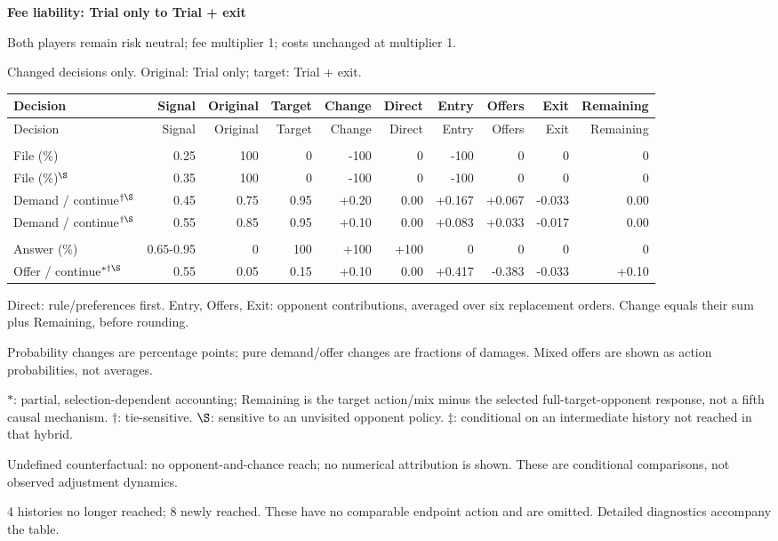 \documentclass[10pt]{article}
\begin{document}
{\large\bfseries Fee liability: Trial only to Trial + exit}\par
Both players remain risk neutral; fee multiplier 1; costs unchanged at multiplier 1.\par
{\small Changed decisions only. Original: Trial only; target: Trial + exit.}\par
{\small\setlength{\tabcolsep}{3pt}\begin{longtable}{@{}>{\raggedright\arraybackslash}p{1.65in}rrrrrrrrr@{}}
\toprule Decision & Signal & Original & Target & Change & Direct & Entry & Offers & Exit & Remaining \\\midrule\endfirsthead
\toprule Decision & Signal & Original & Target & Change & Direct & Entry & Offers & Exit & Remaining \\\midrule\endhead
\bottomrule\endfoot
\multicolumn{10}{@{}l}{\textbf{Plaintiff}}\\
File (\%) & 0.25 & 100 & 0 & -100 & 0 & -100 & 0 & 0 & 0\\
File (\%)$^{\S}$ & 0.35 & 100 & 0 & -100 & 0 & -100 & 0 & 0 & 0\\
Demand / continue$^{\dagger\S}$ & 0.45 & 0.75 & 0.95 & +0.20 & 0.00 & +0.167 & +0.067 & -0.033 & 0.00\\
Demand / continue$^{\dagger\S}$ & 0.55 & 0.85 & 0.95 & +0.10 & 0.00 & +0.083 & +0.033 & -0.017 & 0.00\\
\multicolumn{10}{@{}l}{\textbf{Defendant}}\\
Answer (\%) & 0.65-0.95 & 0 & 100 & +100 & +100 & 0 & 0 & 0 & 0\\
Offer / continue$^{*\dagger\S}$ & 0.55 & 0.05 & 0.15 & +0.10 & 0.00 & +0.417 & -0.383 & -0.033 & +0.10\\
\end{longtable}}
{\footnotesize Direct: rule/preferences first. Entry, Offers, Exit: opponent contributions, averaged over six replacement orders. Change equals their sum plus Remaining, before rounding.\par
Probability changes are percentage points; pure demand/offer changes are fractions of damages. Mixed offers are shown as action probabilities, not averages.\par
$*$: partial, selection-dependent accounting; Remaining is the target action/mix minus the selected full-target-opponent response, not a fifth causal mechanism. $\dagger$: tie-sensitive. $\S$: sensitive to an unvisited opponent policy. $\ddagger$: conditional on an intermediate history not reached in that hybrid.\par
Undefined counterfactual: no opponent-and-chance reach; no numerical attribution is shown. These are conditional comparisons, not observed adjustment dynamics.\par
4 histories no longer reached; 8 newly reached. These have no comparable endpoint action and are omitted. Detailed diagnostics accompany the table.}\par
\end{document}
